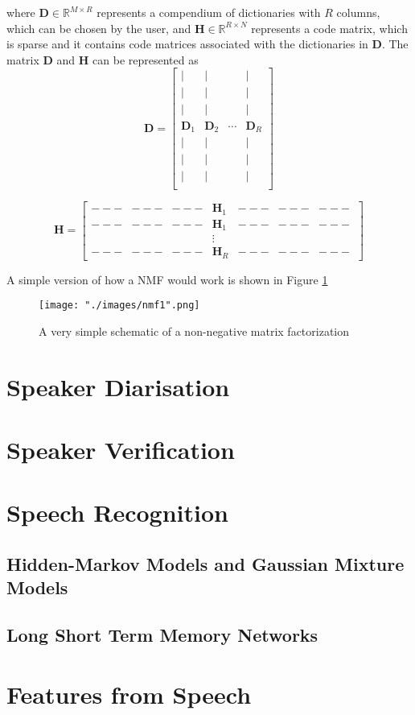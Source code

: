 where $\bm{D} \in \mathbb{R}^{M \times R}$ represents a compendium of dictionaries with $R$ columns, which can be chosen by the user, and $\bm{H} \in \mathbb{R}^{R \times N}$ represents a code matrix, which is sparse and it contains code matrices associated with the dictionaries in $\bm{D}$. The matrix $\bm{D}$ and $\bm{H}$ can be represented as
\begin{equation*}
    \bm{D} = \begin{bmatrix}
    | & | & & | \\
    | & | & & | \\
    | & | & & | \\
    \bm{D}_1 & \bm{D}_2 & \cdots & \bm{D}_R \\
    | & | & & | \\
    | & | & & | \\
    | & | & & | \\
    \end{bmatrix}
\end{equation*}

\begin{equation*}
\bm{H} =
    \begin{bmatrix}
        --- & --- & --- & \bm{H}_1 & --- & --- & --- \\
        --- & --- & --- & \bm{H}_1 & --- & --- & --- \\
            &     &     & \vdots   &     &     &     \\
        --- & --- & --- & \bm{H}_R & --- & --- & --- \
    \end{bmatrix}
\end{equation*}

A simple version of how a NMF would work is shown in Figure \ref{fig::nmf_simple}

\begin{figure}[H]
\begin{center}
    \texttt{[image: "./images/nmf1".png]}
    \caption{A very simple schematic of a non-negative matrix factorization}
    \label{fig::nmf_simple}
\end{center}
\end{figure}

\section{Speaker Diarisation}
\section{Speaker Verification}
\section{Speech Recognition}
\subsection{Hidden-Markov Models and Gaussian Mixture Models}
\subsection{Long Short Term Memory Networks}

\section{Features from Speech}
